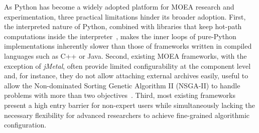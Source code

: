 \documentclass[final,5p,times,twocolumn]{elsarticle}
\begin{document}
As Python has become a widely adopted platform for MOEA research and experimentation, three practical limitations hinder its broader adoption. First, the interpreted nature of Python, combined with libraries that keep hot-path computations inside the interpreter~\cite{BNG+19,FDG+12,hadka15}, makes the inner loops of pure-Python implementations inherently slower than those of frameworks written in compiled languages such as C++ or Java. Second, existing MOEA frameworks, with the exception of \textit{jMetal}, often provide limited configurability at the component level and, for instance, they do not allow attaching external archives easily, useful to allow the Non-dominated Sorting Genetic Algorithm II (NSGA-II) to handle problems with more than two objectives~\cite{IPS20}. Third, most existing frameworks present a high entry barrier for non-expert users while simultaneously lacking the necessary flexibility for advanced researchers to achieve fine-grained algorithmic configuration. 
\end{document}
